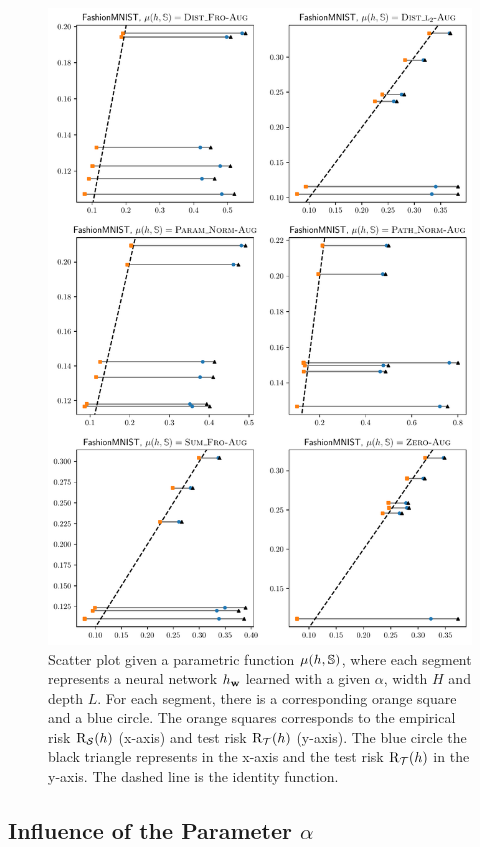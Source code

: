 \begin{noaddcontents}
\begin{figure}
    \centering
    \includegraphics[width=0.77\linewidth]{chapter_7/figures/gap_fashion_aug.pdf}
    \caption{
    Scatter plot given a parametric function $\operatorname{\mu}(h, \mathbb{S})$, where each segment represents a neural network $h_{\mathbf{w}}$ learned with a given $\alpha$, width $H$ and depth $L$.
    For each segment, there is a corresponding orange square and a blue circle.
    The orange squares corresponds to the empirical risk $\text{R}_{\mathcal{S}}(h)$ (x-axis) and test risk $\text{R}_{\mathcal{T}}(h)$ (y-axis).
    The blue circle \resp the black triangle represents  \resp {} in the x-axis and the test risk $\text{R}_{\mathcal{T}}(h)$ in the y-axis.
    The dashed line is the identity function.
    }
    \label{chap:dis-mu:fig:gap-fashion-aug}
\end{figure}

\subsection{Influence of the Parameter $\alpha$}


\end{noaddcontents}
